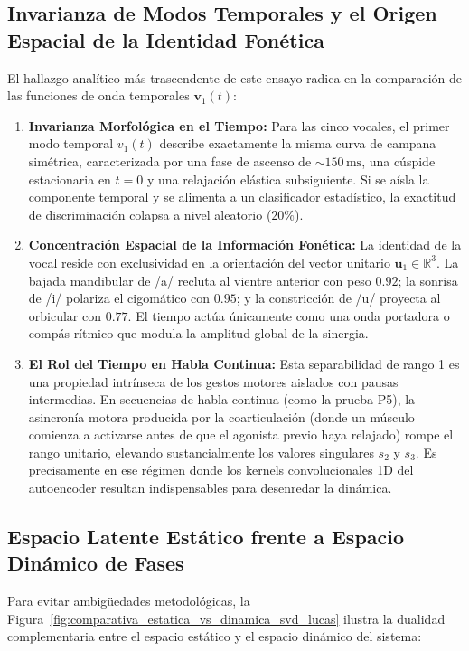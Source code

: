\documentclass[11pt,a4paper,openany]{book}
\theoremstyle{definition}
\begin{document}
\subsection{Invarianza de Modos Temporales y el Origen Espacial de la Identidad Fonética}
\label{subsec:svd_invarianza_temporal}

El hallazgo analítico más trascendente de este ensayo radica en la comparación de las funciones de onda temporales $\mathbf{v}_1(t)$:
\begin{enumerate}
    \item \textbf{Invarianza Morfológica en el Tiempo:} Para las cinco vocales, el primer modo temporal $v_1(t)$ describe exactamente la misma curva de campana simétrica, caracterizada por una fase de ascenso de $\sim 150\,\text{ms}$, una cúspide estacionaria en $t = 0$ y una relajación elástica subsiguiente. Si se aísla la componente temporal y se alimenta a un clasificador estadístico, la exactitud de discriminación colapsa a nivel aleatorio ($20\%$).
    \item \textbf{Concentración Espacial de la Información Fonética:} La identidad de la vocal reside con exclusividad en la orientación del vector unitario $\mathbf{u}_1 \in \mathbb{R}^3$. La bajada mandibular de /a/ recluta al vientre anterior con peso $0.92$; la sonrisa de /i/ polariza el cigomático con $0.95$; y la constricción de /u/ proyecta al orbicular con $0.77$. El tiempo actúa únicamente como una onda portadora o compás rítmico que modula la amplitud global de la sinergia.
    \item \textbf{El Rol del Tiempo en Habla Continua:} Esta separabilidad de rango 1 es una propiedad intrínseca de los gestos motores aislados con pausas intermedias. En secuencias de habla continua (como la prueba P5), la asincronía motora producida por la coarticulación (donde un músculo comienza a activarse antes de que el agonista previo haya relajado) rompe el rango unitario, elevando sustancialmente los valores singulares $s_2$ y $s_3$. Es precisamente en ese régimen donde los kernels convolucionales 1D del autoencoder resultan indispensables para desenredar la dinámica.
\end{enumerate}

\subsection{Espacio Latente Estático frente a Espacio Dinámico de Fases}
\label{subsec:svd_estatico_vs_dinamico}

Para evitar ambigüedades metodológicas, la Figura~\ref{fig:comparativa_estatica_vs_dinamica_svd_lucas} ilustra la dualidad complementaria entre el espacio estático y el espacio dinámico del sistema:
\end{document}
